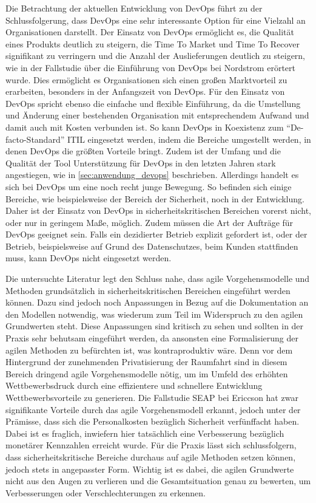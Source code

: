 Die Betrachtung der aktuellen Entwicklung von DevOps führt zu der Schlussfolgerung, dass DevOps eine sehr interessante Option für eine Vielzahl an Organisationen darstellt. 
Der Einsatz von DevOps ermöglicht es, die Qualität eines Produkts deutlich zu steigern, die Time To Market und Time To Recover signifikant zu verringern und die Anzahl der Auslieferungen deutlich zu steigern, wie in der Fallstudie über die Einführung von DevOps bei Nordstrom erörtert wurde. 
Dies ermöglicht es Organisationen sich einen großen Marktvorteil zu erarbeiten, besonders in der Anfangszeit von DevOps. 
Für den Einsatz von DevOps spricht ebenso die einfache und flexible Einführung, da die Umstellung und Änderung einer bestehenden Organisation mit entsprechendem Aufwand und damit auch mit Kosten verbunden ist. 
So kann DevOps in Koexistenz zum \enquote{De-facto-Standard} ITIL eingesetzt werden, indem die Bereiche umgestellt werden, in denen DevOps die größten Vorteile bringt. 
Zudem ist der Umfang und die Qualität der Tool Unterstützung für DevOps in den letzten Jahren stark angestiegen, wie in \autoref{sec:anwendung_devops} beschrieben.
Allerdings handelt es sich bei DevOps um eine noch recht junge Bewegung. 
So befinden sich einige Bereiche, wie beispielsweise der Bereich der Sicherheit, noch in der Entwicklung. 
Daher ist der Einsatz von DevOps in sicherheitskritischen Bereichen vorerst nicht, oder nur in geringem Maße, möglich. Zudem müssen die Art der Aufträge für DevOps geeignet sein. 
Falls ein dezidierter Betrieb explizit gefordert ist, oder der Betrieb, beispielsweise auf Grund des Datenschutzes, beim Kunden stattfinden muss, kann DevOps nicht eingesetzt werden.

Die untersuchte Literatur legt den Schluss nahe, dass agile Vorgehensmodelle und Methoden grundsätzlich in sicherheitskritischen Bereichen eingeführt werden können.
Dazu sind jedoch noch Anpassungen in Bezug auf die Dokumentation an den Modellen notwendig, was wiederum zum Teil im Widerspruch zu den agilen Grundwerten steht.
Diese Anpassungen sind kritisch zu sehen und sollten in der Praxis sehr behutsam eingeführt werden, da ansonsten eine Formalisierung der agilen Methoden zu befürchten ist, was kontraproduktiv wäre.
Denn vor dem Hintergrund der zunehmenden Privatisierung der Raumfahrt sind in diesem Bereich dringend agile Vorgehensmodelle nötig, um im Umfeld des erhöhten Wettbewerbsdruck durch eine effizientere und schnellere Entwicklung Wettbewerbsvorteile zu generieren.
Die Fallstudie SEAP bei Ericcson hat zwar signifikante Vorteile durch das agile Vorgehensmodell erkannt, jedoch unter der Prämisse, dass sich die Personalkosten bezüglich Sicherheit verfünffacht haben.
Dabei ist es fraglich, inwiefern hier tatsächlich eine Verbesserung bezüglich monetärer Kennzahlen erreicht wurde.
Für die Praxis lässt sich schlussfolgern, dass sicherheitskritische Bereiche durchaus auf agile Methoden setzen können, jedoch stets in angepasster Form.
Wichtig ist es dabei, die agilen Grundwerte nicht aus den Augen zu verlieren und die Gesamtsituation genau zu bewerten, um Verbesserungen oder Verschlechterungen zu erkennen.

